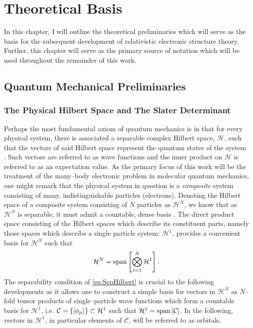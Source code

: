 \chapter{Theoretical Basis}
\label{ch:Theory}

In this chapter, I will outline the theoretical preliminaries which will serve as the basis
for the subsequent development of relativistic electronic structure theory. Further, this
chapter will serve as the primary source of notation which will be used throughout the
remainder of this work. 

\section{Quantum Mechanical Preliminaries}
\label{sec:QM}

\subsection{The Physical Hilbert Space and The Slater Determinant}
\label{sec:SD}

Perhaps the most fundamental axiom of quantum mechanics is in that for every physical
system, there is associated a separable complex Hilbert space, $\mathcal{H}$, such that
the vectors of said Hilbert space represent the quantum states 
of the system \cite{VonNeumann55_book}. Such vectors are referred to as wave functions
and the inner product on $\mathcal{H}$ is referred to as an expectation value.
As the primary focus of this work will be the treatment of the many--body electronic
problem in molecular quantum mechanics, one might remark that the physical system
in question is a \emph{composite} system consisting of many, indistinguishable 
particles (electrons). Denoting the Hilbert space of a composite system consisting
of $N$ particles as $\mathcal{H}^N$, we know that as $\mathcal{H}^N$ is separable,
it must admit a countable, dense basis \cite{Lee03_book}.
The direct product space consisting of the Hilbert spaces
which describe its constituent parts, namely those spaces which describe a
single particle system: $\mathcal{H}^1$, provides a convenient basis for $\mathcal{H}^N$ such that
\begin{equation}
  \label{eq:SepHilbert}
  \mathcal{H}^N = \mathrm{span}\left[ \bigotimes_{i = 1}^N \mathcal{H}^1 \right].
\end{equation}
The separability condition of \cref{eq:SepHilbert} is crucial to the following developments
as it allows one to construct a simple basis for vectors in $\mathcal{H}^N$
as $N$--fold tensor products of single--particle wave functions which form a countable basis for $\mathcal{H}^1$, 
i.e. $\mathcal{C} = \left \lbrace \left\vert \phi_p \right\rangle \right\rbrace  \subset \mathcal{H}^1$ such that 
$\mathcal{H}^1 = \mathrm{span}\left[ \mathcal{C} \right]$. In the following, vectors in $\mathcal{H}^1$, in particular elements of $\mathcal{C}$,
will be referred to as orbitals.

